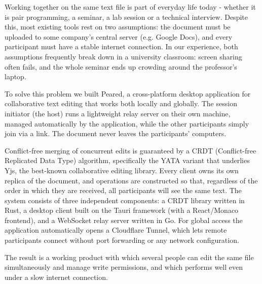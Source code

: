 Working together on the same text file is part of everyday life today -
whether it is pair programming, a seminar, a lab session or a technical
interview. Despite this, most existing tools rest on two assumptions: the
document must be uploaded to some company's central server (e.g. Google
Docs), and every participant must have a stable internet connection. In
our experience, both assumptions frequently break down in a university
classroom: screen sharing often fails, and the whole seminar ends up
crowding around the professor's laptop.

To solve this problem we built Peared, a cross-platform desktop
application for collaborative text editing that works both locally and
globally. The session initiator (the host) runs a lightweight relay
server on their own machine, managed automatically by the application,
while the other participants simply join via a link. The document never
leaves the participants' computers.

Conflict-free merging of concurrent edits is guaranteed by a CRDT
(Conflict-free Replicated Data Type) algorithm, specifically the YATA
variant that underlies Yjs, the best-known collaborative editing library.
Every client owns its own replica of the document, and operations are
constructed so that, regardless of the order in which they are received,
all participants will see the same text. The system consists of three
independent components: a CRDT library written in Rust, a desktop client
built on the Tauri framework (with a React/Monaco frontend), and a
WebSocket relay server written in Go. For global access the application
automatically opens a Cloudflare Tunnel, which lets remote participants
connect without port forwarding or any network configuration.

The result is a working product with which several people can edit the
same file simultaneously and manage write permissions, and which performs
well even under a slow internet connection.
